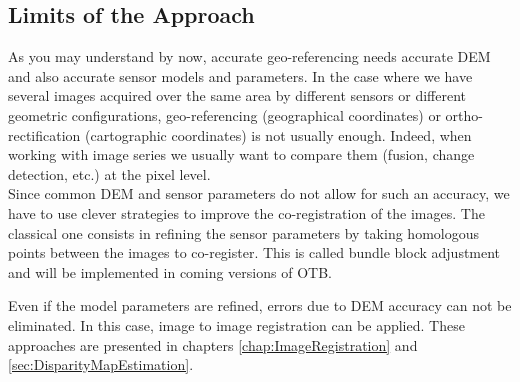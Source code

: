 


\subsection{Limits of the Approach}
\label{LimitsoftheApproach}

As you may understand by now, accurate geo-referencing needs accurate
DEM and also accurate sensor models and parameters. In the case where
we have several images acquired over the same area by different
sensors or different geometric configurations, geo-referencing (geographical coordinates) or ortho-rectification
(cartographic coordinates) is not usually enough. Indeed, when working
with image series we usually want to compare them (fusion, change
detection, etc.) at the pixel level.\\

Since common DEM and sensor parameters do not allow for such an
accuracy, we have to use clever strategies to improve the
co-registration of the images. The classical one consists in refining
the sensor parameters by taking homologous points between the images
to co-register. This is called bundle block adjustment and will be
implemented in coming versions of OTB.

Even if the model parameters are refined, errors due to DEM accuracy
can not be eliminated. In this case, image to image registration can
be applied. These approaches are presented in chapters
\ref{chap:ImageRegistration} and \ref{sec:DisparityMapEstimation}.



